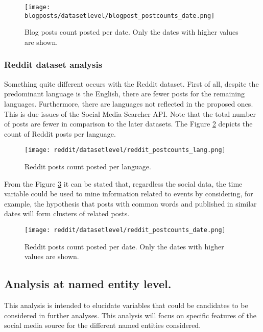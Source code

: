 \begin{figure}[H]
	\begin{center}
		\texttt{[image: blogposts/datasetlevel/blogpost\_postcounts\_date.png]}
		\caption{Blog posts count posted per date. Only the dates with higher values are shown.}
		\label{fig:blogpost_postcounts_date}
	\end{center}
\end{figure}


\subsubsection{Reddit dataset analysis}
Something quite different occurs with the Reddit dataset. First of all, despite the predominant language is the English, there are fewer posts for the remaining languages. Furthermore, there are languages not reflected in the proposed ones. This is due issues of the Social Media Searcher API. Note that the total number of posts are fewer in comparison to the later datasets. The Figure \ref{fig:reddit_postcounts_lang} depicts the count of Reddit posts per language.

\begin{figure}[H]
	\begin{center}
		\texttt{[image: reddit/datasetlevel/reddit\_postcounts\_lang.png]}
		\caption{Reddit posts count posted per language.}
		\label{fig:reddit_postcounts_lang}
	\end{center}
\end{figure}

From the Figure \ref{fig:reddit_postcounts_date} it can be stated that, regardless the social data, the time variable could be used to mine information related to events by considering, for example, the hypothesis that posts with common words and published in similar dates will form clusters of related posts.
\begin{figure}[H]
	\begin{center}
		\texttt{[image: reddit/datasetlevel/reddit\_postcounts\_date.png]}
		\caption{Reddit posts count posted per date. Only the dates with higher values are shown.}
		\label{fig:reddit_postcounts_date}
	\end{center}
\end{figure}

% 

\subsection{Analysis at named entity level.}
This analysis is intended to elucidate variables that could be candidates to be considered in further analyses. This analysis will focus on specific features of the social media source for the different named entities considered.

